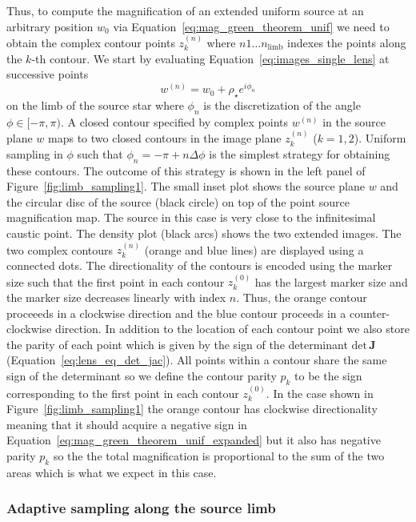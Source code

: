 \documentclass[12pt,dvipsnames]{report}
\renewcommand{\vec}[1]{\boldsymbol{\mathbf{#1}}}
\begin{document}
Thus, to compute the magnification of an extended uniform source at an
arbitrary position $w_0$ via Equation~\ref{eq:mag_green_theorem_unif} we need
to obtain the complex contour points $z_k^{(n)}$ where $n 1\dots
    n_\mathrm{limb}$ indexes the points along the $k$-th contour. We start by
evaluating Equation~\ref{eq:images_single_lens} at successive points
\begin{equation}
    w^{(n)}=w_0 + \rho_\star e^{i\phi_n}
\end{equation}
on the limb of the source star where $\phi_n$  is the discretization of the
angle $\phi\in[-\pi,\pi)$. A closed contour specified by complex points $w^{(n)}$ in the
source plane $w$ maps to two closed contours in the image plane $z^{(n)}_k$ ($k=1,2$).
Uniform sampling in $\phi$ such that $\phi_n=-\pi+n\Delta\phi$ is the simplest strategy
for obtaining these contours. The outcome of this strategy is shown in the left panel
of Figure~\ref{fig:limb_sampling1}. The small inset plot shows the source plane $w$
and the circular disc of the source (black circle) on top of the point source
magnification map. The source in this case is very close to the infinitesimal caustic
point.  The density plot (black arcs) shows the two extended images. The two complex
contours $z^{(n)}_k$ (orange and blue lines) are displayed using a connected dots.
The directionality of the contours is encoded using the marker size
such that the first point in each contour $z^{(0)}_k$ has the largest marker size
and the marker size decreases linearly with index $n$. Thus, the orange contour
proceeeds in a clockwise direction and the blue contour proceeds in a counter-clockwise
direction. In addition to the location of each contour point we also store the
parity of each point which is given by the sign of the determinant $\mathrm{det}\,\vec J$
(Equation~\ref{eq:lens_eq_det_jac}). All points within a contour share the same sign of
the determinant so we define the contour parity $p_k$ to be the sign corresponding
to the first point in each contour $z^{(0)}_k$. In the case shown in
Figure~\ref{fig:limb_sampling1} the orange contour has clockwise directionality
meaning that it should acquire a negative sign in
Equation~\ref{eq:mag_green_theorem_unif_expanded} but it also has negative parity
$p_k$ so the the total magnification is proportional to the sum of the two areas
which is what we expect in this case.

\subsubsection{Adaptive sampling along the source limb}
\end{document}
